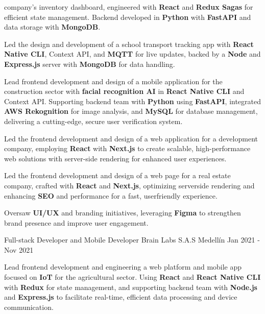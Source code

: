 \begin{cventries}
{\begin{cvitems}
{    company's inventory dashboard, engineered with \textbf{React} and
    \textbf{Redux Sagas} for efficient state management. Backend
    developed in \textbf{Python} with \textbf{FastAPI} and data storage with
    \textbf{MongoDB}.}
    \item {Led the design and development of a school transport tracking app with \textbf{React Native CLI}, Context API, and \textbf{MQTT} for live updates, backed by a \textbf{Node} and \textbf{Express.js} server with \textbf{MongoDB} for data handling.}
    \item {Lead frontend development and design of a mobile
    application for the construction sector with \textbf{facial recognition
    AI} in \textbf{React Native CLI} and Context API. Supporting backend
    team with \textbf{Python} using \textbf{FastAPI}, integrated \textbf{AWS Rekognition}
    for image analysis, and \textbf{MySQL} for database management,
    delivering a cutting-edge, secure user verification system.}
    \item {Led the frontend development and design of a web application for a
    development company, employing \textbf{React} with \textbf{Next.js} to create
    scalable, high-performance web solutions with server-side
    rendering for enhanced user experiences.}
    \item {Led the frontend development and design of a web page for a real
    estate company, crafted with \textbf{React} and \textbf{Next.js}, optimizing serverside rendering and enhancing \textbf{SEO} and performance for a fast, userfriendly experience.}
    \item {Oversaw \textbf{UI/UX} and branding initiatives, leveraging \textbf{Figma} to strengthen brand presence and improve user engagement.}
  \end{cvitems}
}
\cventry
{Full-stack Developer and Mobile Developer} %
{Brain Labs S.A.S} %
{Medellín} %
{Jan 2021 - Nov 2021} %
{
  \begin{cvitems}
    \item {Lead frontend development and engineering a web platform and
    mobile app focused on \textbf{IoT} for the agricultural sector. Using \textbf{React} and
    \textbf{React Native CLI} with \textbf{Redux} for state management, and supporting
    backend team with \textbf{Node.js} and \textbf{Express.js} to facilitate real-time,
    efficient data processing and device communication.}
  \end{cvitems}
}
\end{cventries}